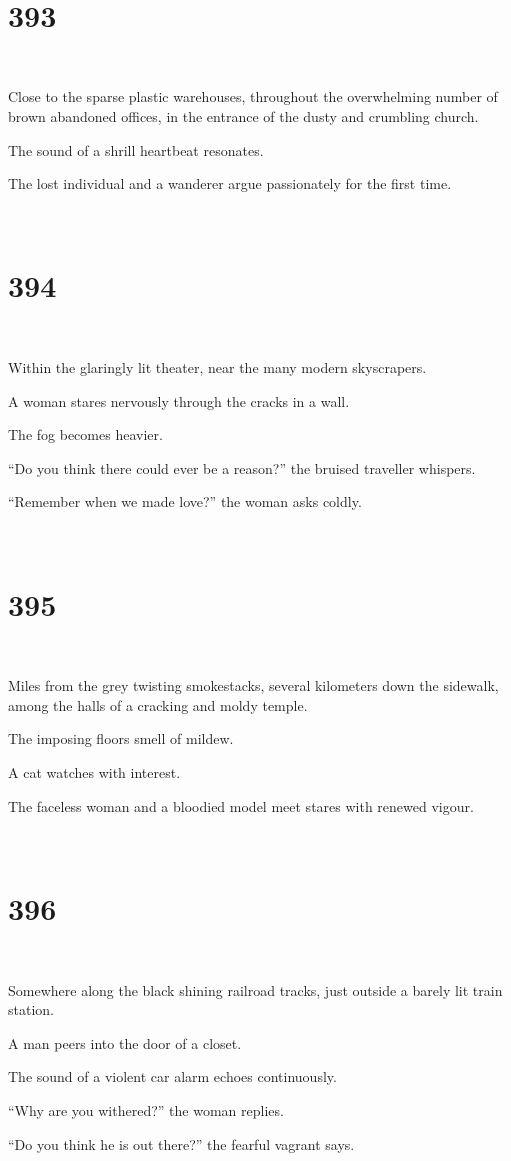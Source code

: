 \documentclass{report}
\begin{document}
~
\chapter*{393}
~

Close to the sparse plastic warehouses, throughout the overwhelming number of brown abandoned offices, in the entrance of the dusty and crumbling church.

The sound of a shrill heartbeat resonates.

The lost individual and a wanderer argue passionately for the first time.

~
\chapter*{394}
~

Within the glaringly lit theater, near the many modern skyscrapers.

A woman stares nervously through the cracks in a wall.

The fog becomes heavier.

``Do you think there could ever be a reason?'' the bruised traveller whispers.

``Remember when we made love?'' the woman asks coldly.

~
\chapter*{395}
~

Miles from the grey twisting smokestacks, several kilometers down the sidewalk, among the halls of a cracking and moldy temple.

The imposing floors smell of mildew.

A cat watches with interest.

The faceless woman and a bloodied model meet stares with renewed vigour.

~
\chapter*{396}
~

Somewhere along the black shining railroad tracks, just outside a barely lit train station.

A man peers into the door of a closet.

The sound of a violent car alarm echoes continuously.

``Why are you withered?'' the woman replies.

``Do you think he is out there?'' the fearful vagrant says.
\end{document}
